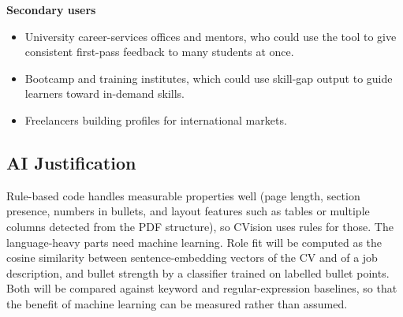 \documentclass[11pt,a4paper]{article}
\begin{document}
\textbf{Secondary users}
\begin{itemize}
  \item University career-services offices and mentors, who could use
  the tool to give consistent first-pass feedback to many students at
  once.
  \item Bootcamp and training institutes, which could use skill-gap
  output to guide learners toward in-demand skills.
  \item Freelancers building profiles for international markets.
\end{itemize}

\subsection{AI Justification}

Rule-based code handles measurable properties well (page length,
section presence, numbers in bullets, and layout features such as tables
or multiple columns detected from the PDF structure), so CVision uses
rules for those. The language-heavy parts need machine learning. Role
fit will be computed as the cosine similarity between sentence-embedding
vectors of the CV and of a job description, and bullet strength by a
classifier trained on labelled bullet points. Both will be compared
against keyword and regular-expression baselines, so that the benefit of
machine learning can be measured rather than assumed.
\end{document}
